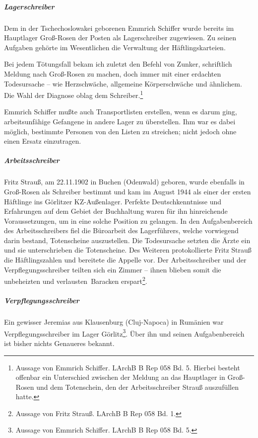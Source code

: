 \documentclass[a4paper,12pt,ngerman,
]{nisebook}
\begin{document}
\subparagraph{Lagerschreiber}
Dem in der Tschechoslowakei geborenen \mbox{Emmrich} Schiffer wurde bereits im Hauptlager Groß-Rosen der Posten als Lagerschreiber zugewiesen. Zu seinen Aufgaben gehörte im Wesentlichen die Verwaltung der Häftlingskarteien.
\begin{leftbar}
Bei jedem Tötungsfall bekam ich zuletzt den Befehl von Zunker, schriftlich Meldung nach Groß-Rosen zu machen, doch immer mit einer erdachten Todesursache -- wie Herzschwäche, allgemeine Körperschwäche und ähnlichem. Die Wahl der Diagnose oblag dem Schreiber.\footnote{Aussage von Emmrich Schiffer. LArchB B Rep 058 Bd. 5. Hierbei besteht offenbar ein Unterschied zwischen der Meldung an das Hauptlager in Groß-Rosen und dem Totenschein, den der Arbeitsschreiber Strauß  auszufüllen hatte.}
\end{leftbar}
Emmrich Schiffer mußte auch Transportlisten erstellen, wenn es darum ging, arbeitsunfähige Gefangene in andere Lager zu  überstellen. Ihm war es dabei möglich, bestimmte Personen von den Listen zu streichen; nicht jedoch ohne einen Ersatz einzutragen.


\subparagraph{Arbeitsschreiber}
Fritz Strauß, am 22.11.1902 in Buchen (Odenwald) geboren, wurde ebenfalls in Groß-Rosen als Schreiber bestimmt und kam im August 1944 als einer der ersten Häftlinge ins Görlitzer KZ-Außenlager. Perfekte Deutschkenntnisse und Erfahrungen auf dem Gebiet der Buchhaltung waren für ihn hinreichende Voraussetzungen, um in eine solche Position zu gelangen.
In den Aufgabenbereich des Arbeitsschreibers fiel die Büroarbeit des Lagerführers, welche vorwiegend darin bestand, Totenscheine auszustellen. Die Todesursache setzten die Ärzte ein und sie unterschrieben die Totenscheine. Des Weiteren protokollierte Fritz Strauß die Häftlingszahlen und bereitete die Appelle vor.\newline
Der Arbeitsschreiber und der Verpflegungsschreiber teilten sich ein Zimmer -- ihnen blieben somit die unbeheizten und \glqq verlausten\grqq~Baracken erspart\footnote{Aussage von Fritz Strauß. LArchB B Rep 058 Bd. 1.}.

\subparagraph{Verpflegungsschreiber}
Ein gewisser Jeremias aus Klausenburg (Cluj-Napoca) in Rumänien war Verpflegungsschreiber im Lager Görlitz\footnote{Aussage von Emmrich Schiffer. LArchB B Rep 058 Bd. 5.}.
Über ihn und seinen Aufgabenbereich ist bisher nichts Genaueres bekannt.
\end{document}
